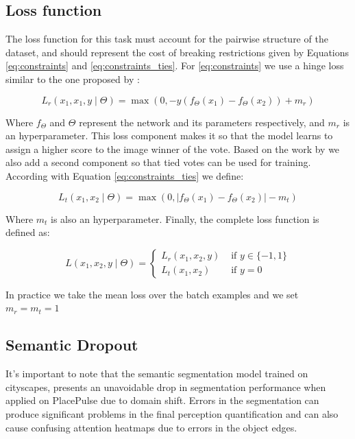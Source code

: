 \subsection{Loss function} \label{section:loss}
The loss function for this task must account for the pairwise structure of the dataset,
and should represent the cost of breaking restrictions given by Equations
\ref{eq:constraints} and \ref{eq:constraints_ties}. For \ref{eq:constraints} we use
a hinge loss similar to the one proposed by :

\begin{equation}
	L_r(x_1,x_1,y \mid \Theta) = \max(0, -y(f_\Theta(x_1) - f_\Theta(x_2)) + m_r)
	\label{eq:r_loss}
\end{equation}

Where $f_\Theta$ and $\Theta$  represent the network and its parameters respectively, and $m_r$
is an hyperparameter. This loss component makes it so that the model learns to assign a higher
score to the image winner of the vote. Based on the work by  we also add a second component so that tied votes can
be used for training. According with Equation \ref{eq:constraints_ties} we define:

\begin{equation}
	L_t(x_1,x_2 \mid \Theta) = \max(0, |f_\Theta(x_1) - f_\Theta(x_2)| - m_t)
	\label{eq:t_loss}
\end{equation}

Where $m_t$ is also an hyperparameter. Finally, the complete loss function is defined as:

\begin{equation}
	L(x_1,x_2,y \mid \Theta) =\left\{\begin{matrix}
		L_r(x_1,x_2,y)&\text{ if } y \in \{-1,1\} \\
		L_t(x_1,x_2)&\text{ if } y=0
	\end{matrix}\right.
\end{equation}

In practice we take the mean loss over the batch examples and we set $m_r=m_t=1$

\subsection{Semantic Dropout}
It's important to note that the semantic segmentation model trained on cityscapes,
presents an unavoidable drop in segmentation performance when applied on PlacePulse
due to domain shift. Errors in the segmentation can produce  significant problems
in the final perception quantification and can also cause confusing
attention heatmaps due to errors in the object edges.

